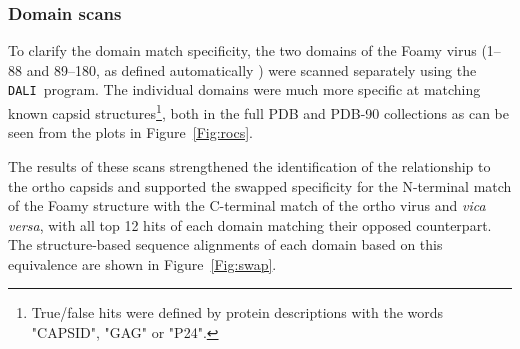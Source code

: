 \documentclass{bmcart}
\newcommand{\DALI}{{\tt DALI}}
\newcommand{\Fig}[1]{Figure~\ref{Fig:#1}}
\begin{document}
\subsubsection*{Domain scans}

To clarify the domain match specificity, the two domains of the Foamy virus (1--88 and 89--180,
as defined automatically \cite{TaylorWR99b}) were scanned separately using the \DALI\ program.
The individual domains were much more specific at matching known capsid structures\footnote{
True/false hits were defined by protein descriptions with the words "CAPSID", "GAG" or "P24".
},
both in the full PDB and PDB-90 collections as can be seen from the plots in \Fig{rocs}.

The results of these scans strengthened the identification
of the relationship to the ortho capsids and supported the swapped specificity for the N-terminal
match of the Foamy structure with the C-terminal match of the ortho virus and {\em vica versa}, with all
top 12 hits of each domain matching their opposed counterpart.
The structure-based sequence alignments of each domain based on this equivalence are shown in \Fig{swap}.
\end{document}
